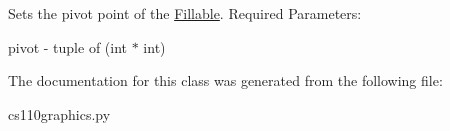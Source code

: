 Sets the pivot point of the \hyperlink{classcs110graphics_1_1Fillable}{Fillable}. Required Parameters:
\begin{DoxyItemize}
\item pivot -\/ tuple of (int $\ast$ int) 
\end{DoxyItemize}

The documentation for this class was generated from the following file:\begin{DoxyCompactItemize}
\item 
cs110graphics.py\end{DoxyCompactItemize}

